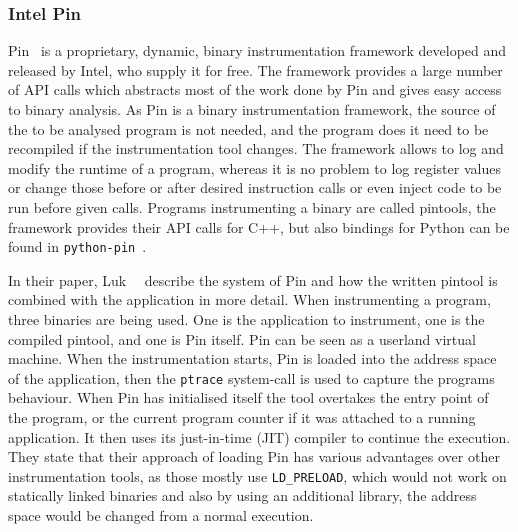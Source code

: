 \subsubsection{Intel Pin}

Pin~\cite{pintool} is a proprietary, dynamic, binary instrumentation framework
developed and released by Intel, who supply it for free. The framework provides
a large number of API calls which abstracts most of the work done by Pin and
gives easy access to binary analysis. As Pin is a binary instrumentation
framework, the source of the to be analysed program is not needed, and the
program does it need to be recompiled if the instrumentation tool changes. The
framework allows to log and modify the runtime of a program, whereas it is no
problem to log register values or change those before or after desired
instruction calls or even inject code to be run before given calls. Programs
instrumenting a binary are called pintools, the framework provides their API
calls for C++, but also bindings for Python can be found in
\texttt{python-pin}~\cite{pythonpin}.

In their paper, Luk~\etal~\cite{pintool} describe the system of Pin and
how the written pintool is combined with the application in more detail. When
instrumenting a program, three binaries are being used. One is the application
to instrument, one is the compiled pintool, and one is Pin itself. Pin can be
seen as a userland virtual machine. When the instrumentation starts, Pin is
loaded into the address space of the application, then the \texttt{ptrace}
system-call is used to capture the program\textquotesingle s behaviour. When Pin
has initialised itself the tool overtakes the entry point of the program, or
the current program counter if it was attached to a running application. It
then uses its just-in-time (JIT) compiler to continue the execution. They state
that their approach of loading Pin has various advantages over other
instrumentation tools, as those mostly use \texttt{LD\_PRELOAD}, which would not
work on statically linked binaries and also by using an additional library, the
address space would be changed from a normal execution.

